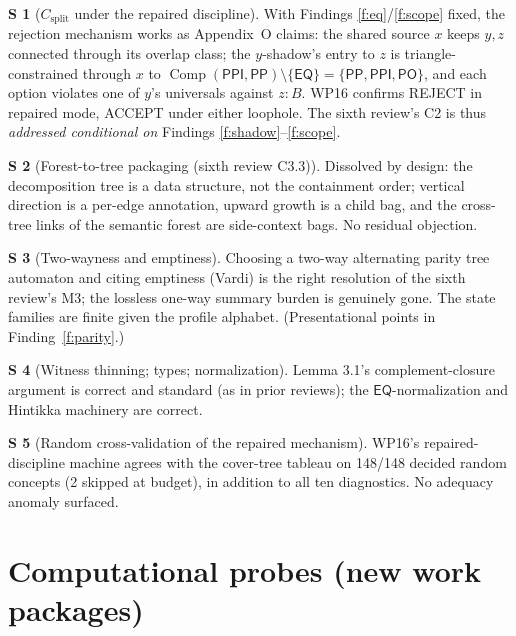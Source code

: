 \documentclass[11pt]{article}
\theoremstyle{definition}
\newtheorem{soundstep}{S}
\newcommand{\EQ}{\mathsf{EQ}}
\newcommand{\PP}{\mathsf{PP}}
\newcommand{\PPI}{\mathsf{PPI}}
\newcommand{\PO}{\mathsf{PO}}
\newcommand{\Comp}{\operatorname{Comp}}
\begin{document}
\begin{soundstep}[$C_{\mathrm{split}}$ under the repaired discipline]
With Findings \ref{f:eq}/\ref{f:scope} fixed, the rejection mechanism works
as Appendix~O claims: the shared source $x$ keeps $y,z$ connected through
its overlap class; the $y$-shadow's entry to $z$ is triangle-constrained
through $x$ to $\Comp(\PPI,\PP)\setminus\{\EQ\}=\{\PP,\PPI,\PO\}$, and each
option violates one of $y$'s universals against $z{:}B$.  WP16 confirms
REJECT in repaired mode, ACCEPT under either loophole.  The sixth review's
C2 is thus \emph{addressed conditional on} Findings
\ref{f:shadow}--\ref{f:scope}.
\end{soundstep}

\begin{soundstep}[Forest-to-tree packaging (sixth review C3.3)]
Dissolved by design: the decomposition tree is a data structure, not the
containment order; vertical direction is a per-edge annotation, upward
growth is a child bag, and the cross-tree links of the semantic forest are
side-context bags.  No residual objection.
\end{soundstep}

\begin{soundstep}[Two-wayness and emptiness]
Choosing a two-way alternating parity tree automaton and citing emptiness
(Vardi) is the right resolution of the sixth review's M3; the lossless
one-way summary burden is genuinely gone.  The state families are finite
given the profile alphabet.  (Presentational points in
Finding~\ref{f:parity}.)
\end{soundstep}

\begin{soundstep}[Witness thinning; types; normalization]
Lemma 3.1's complement-closure argument is correct and standard (as in
prior reviews); the $\EQ$-normalization and Hintikka machinery are correct.
\end{soundstep}

\begin{soundstep}[Random cross-validation of the repaired mechanism]
WP16's repaired-discipline machine agrees with the cover-tree tableau on
148/148 decided random concepts (2 skipped at budget), in addition to all
ten diagnostics.  No adequacy anomaly surfaced.
\end{soundstep}

\section{Computational probes (new work packages)}\label{sec:probes}
\end{document}
